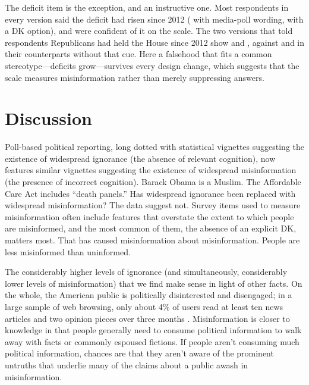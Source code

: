 \documentclass[11pt]{article}
\begin{document}
The deficit item is the exception, and an instructive one. Most respondents in every version said the deficit had risen since 2012 ( with media-poll wording,  with a DK option), and  were confident of it on the scale. The two versions that told respondents Republicans had held the House since 2012 show  and , against  and  in their counterparts without that cue. Here a falsehood that fits a common stereotype---deficits grow---survives every design change, which suggests that the scale measures misinformation rather than merely suppressing answers.

\FloatBarrier
\section{Discussion}

Poll-based political reporting, long dotted with statistical vignettes suggesting the existence of widespread ignorance (the absence of relevant cognition), now features similar vignettes suggesting the existence of widespread misinformation (the presence of incorrect cognition). Barack Obama is a Muslim. The Affordable Care Act includes ``death panels.'' Has widespread ignorance been replaced with widespread misinformation? The data suggest not. Survey items used to measure misinformation often include features that overstate the extent to which people are misinformed, and the most common of them, the absence of an explicit DK, matters most. That has caused misinformation about misinformation. People are less misinformed than uninformed.

The considerably higher levels of ignorance (and simultaneously, considerably lower levels of misinformation) that we find make sense in light of other facts. On the whole, the American public is politically disinterested and disengaged; in a large sample of web browsing, only about 4\% of users read at least ten news articles and two opinion pieces over three months \citep{flaxman2016}. Misinformation is closer to knowledge in that people generally need to consume political information to walk away with facts or commonly espoused fictions. If people aren't consuming much political information, chances are that they aren't aware of the prominent untruths that underlie many of the claims about a public awash in misinformation.
\end{document}
